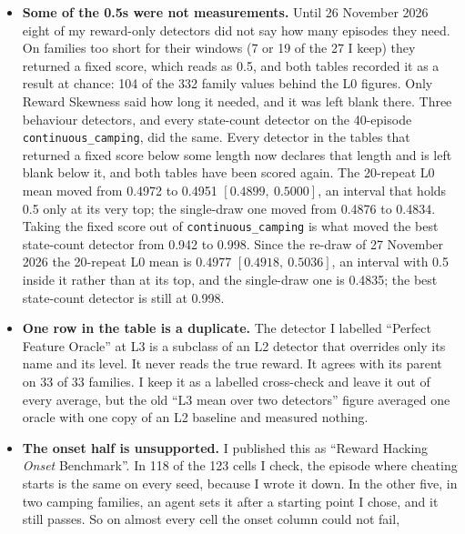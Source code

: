 \documentclass[11pt,a4paper]{article}
\newcommand{\code}[1]{\texttt{\small #1}}
\begin{document}
\begin{itemize}
      in each repeat averages 0.575 $[0.565,\ 0.586]$, which leaves out 0.5, but it is
      the largest of 13 numbers, picked after the fact, and picking the largest pushes
      it up by itself. The average over the 13 is 0.498 $[0.492,\ 0.504]$, with 0.5
      inside it, not at its edge.
\item \textbf{Some of the 0.5s were not measurements.} Until 26 November 2026 eight
      of my reward-only detectors did not say how many episodes they need. On
      families too short for their windows (7 or 19 of the 27 I keep) they returned a
      fixed score, which reads as 0.5, and both tables recorded it as a result at
      chance: 104 of the 332 family values behind the L0 figures. Only Reward
      Skewness said how long it needed, and it was left blank there. Three behaviour
      detectors, and every state-count detector on the 40-episode
      \code{continuous\_camping}, did the same. Every detector in the tables that
      returned a fixed score below some length now declares that length and is left
      blank below it, and both tables have been scored again. The
      20-repeat L0 mean moved from 0.4972 to 0.4951 $[0.4899,\ 0.5000]$, an interval
      that holds 0.5 only at its very top; the single-draw one moved from 0.4876 to
      0.4834. Taking the fixed score out of \code{continuous\_camping} is what moved
      the best state-count detector from 0.942 to 0.998. Since the re-draw of 27
      November 2026 the 20-repeat L0 mean is 0.4977 $[0.4918,\ 0.5036]$, an interval
      with 0.5 inside it rather than at its top, and the single-draw one is 0.4835;
      the best state-count detector is still at 0.998.
\item \textbf{One row in the table is a duplicate.} The detector I labelled
      ``Perfect Feature Oracle'' at L3 is a subclass of an L2 detector that
      overrides only its name and its level. It never reads the true reward. It
      agrees with its parent on 33 of 33 families. I keep it as a labelled
      cross-check and leave it out of every average, but the old ``L3 mean over
      two detectors'' figure averaged one oracle with one copy of an L2 baseline
      and measured nothing.
\item \textbf{The onset half is unsupported.} I published this as ``Reward Hacking
      \emph{Onset} Benchmark''. In 118 of the 123 cells I check, the episode where
      cheating starts is the same on every seed, because I wrote it down. In the other
      five, in two camping families, an agent sets it after a starting point I chose,
      and it still passes. So on almost every cell the onset column could not fail,

\end{itemize}
\end{document}
